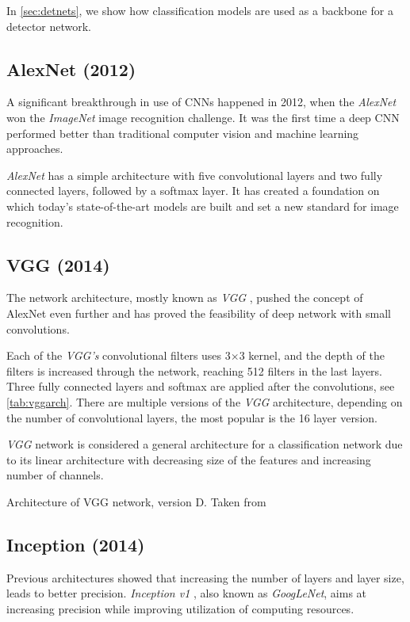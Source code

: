 In \cref{sec:detnets}, we show how classification models are used as a backbone for a detector network.

\subsection{AlexNet (2012)}
A significant breakthrough in use of CNNs happened in 2012, when the \textit{AlexNet} \cite{bib:alexnet} won the \textit{ImageNet} image recognition challenge. It was the first time a deep CNN performed better than traditional computer vision and machine learning approaches. 

\textit{AlexNet} has a simple architecture with five convolutional layers and two fully connected layers, followed by a softmax layer. It has created a foundation on which today's state-of-the-art models are built and set a new standard for image recognition.

\subsection{VGG (2014)}
\label{sec:VGG}
The network architecture, mostly known as \textit{VGG} \cite{bib:vgg}, pushed the concept of AlexNet even further and has proved the feasibility of deep network with small convolutions. 

Each of the \textit{VGG's} convolutional filters uses 3$\times$3 kernel, and the depth of the filters is increased through the network, reaching 512 filters in the last layers. Three fully connected layers and softmax are applied after the convolutions, see \cref{tab:vggarch}. There are multiple versions of the \textit{VGG} architecture, depending on the number of convolutional layers, the most popular is the 16 layer version. 

\textit{VGG} network is considered a general architecture for a classification network due to its linear architecture with decreasing size of the features and increasing number of channels. 

\begin{table}
    \centering
    \caption{Architecture of VGG network, version D. Taken from \cite[table 1]{bib:vgg}}
    \label{tab:vggarch}
\end{table}
    
\subsection{Inception (2014)}
\label{sec:inception}
Previous architectures showed that increasing the number of layers and layer size, leads to better precision. \textit{Inception v1} \cite{bib:googlenet}, also known as \textit{GoogLeNet}, aims at increasing precision while improving utilization of computing resources.

